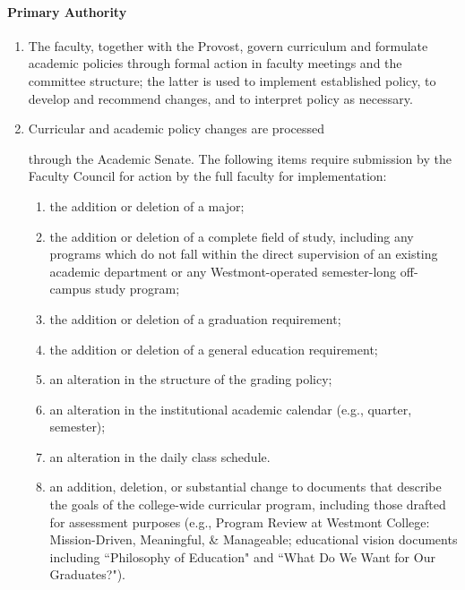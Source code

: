 			\paragraph{Primary Authority}
				\label{sec:CollegeOrganization-Faculty-PrimaryAuthority}
				\begin{enumerate}

					\item{ The faculty, together with the Provost, govern curriculum
						and formulate academic policies through formal action in
						faculty meetings and the committee structure; the latter is
						used to implement established policy, to develop and
						recommend changes, and to interpret policy as necessary.}
					\item{
						\label{sec:CollegeOrganization-Faculty-PrimaryAuthority-Curricular}
						Curricular and academic policy changes are processed

						through the Academic Senate. The following items require
						submission by the Faculty Council for action by the full
						faculty for implementation:
						\begin{enumerate}
							\item{ the addition or deletion of a major;}

							\item{ the addition or deletion of a complete field of study, including any programs which
								do not fall within the direct supervision of an existing academic department or any
								Westmont-operated semester-long off-campus study program;}

							\item{ the addition or deletion of a graduation requirement;}

							\item{ the addition or deletion of a general education requirement;}

							\item{ an alteration in the structure of the grading policy;}

							\item{ an alteration in the institutional academic calendar (e.g., quarter, semester);}

							\item{ an alteration in the daily class schedule.}

							\item{ an addition, deletion, or substantial change to documents that describe the goals of
								the college-wide curricular program, including those drafted for assessment purposes
								(e.g., Program Review at Westmont College: Mission-Driven, Meaningful, \& Manageable;
								educational vision documents including ``Philosophy of Education" and ``What Do We Want
								for Our Graduates?").}

						\end{enumerate}
					}
				\end{enumerate}
